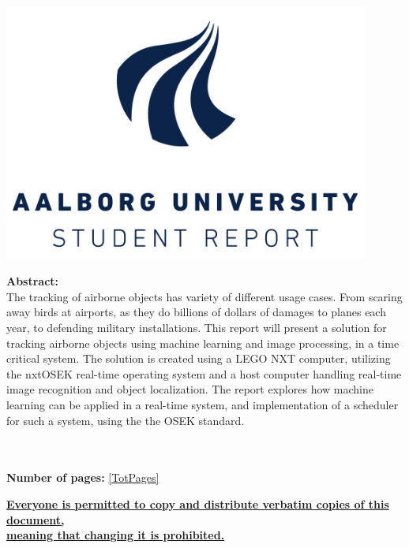 \begin{minipage}[T]{0.45\textwidth}
 \begin{flushright}
  \includegraphics[width=0.9\textwidth]{images/aau_logo.pdf}\\
 \end{flushright}
 \begin{flushleft}
  \textbf{Abstract:}\\
  	The tracking of airborne objects has variety of different usage cases. 
  	From scaring away birds at airports, as they do billions of dollars of damages to planes each year, to defending military installations.
    This report will present a solution for tracking airborne objects using machine learning and image processing, in a time critical system.
    The solution is created using a LEGO NXT computer, utilizing the nxtOSEK real-time operating system and a host computer handling real-time image recognition and object localization.
    The report explores how machine learning can be applied in a real-time system, and implementation of a scheduler for such a system, using the the OSEK standard.
 \end{flushleft}
\end{minipage}\\
\\\large{\textsf{\textbf{\normalsize{Number of pages:}}}} \ref{TotPages}\\
\begin{center}
 \begin{scriptsize}
  \textbf{\underline{Everyone is permitted to copy and distribute verbatim copies of this document,}}\\ \textbf{\underline{ meaning that changing it is prohibited.}}
 \end{scriptsize}
\end{center}
